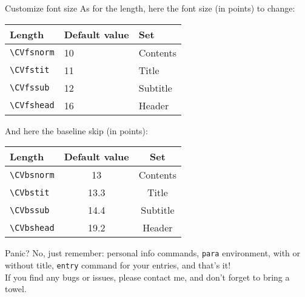 \documentclass[english]{michael-cv}
\begin{document}
\begin{para}{Customize font size}
As for the length, here the font size (in points) to change:\\[1ex]
\begin{tabular}{lll}
\toprule
Length			& Default value	& Set	\\
\midrule
\verb+\CVfsnorm+	& 10		& Contents	\\
\verb+\CVfstit+		& 11		& Title	\\
\verb+\CVfssub+		& 12		& Subtitle	\\
\verb+\CVfshead+	& 16		& Header	\\
\bottomrule
\end{tabular}

\vspace{1ex}
And here the baseline skip (in points):\\[1ex]
\begin{tabular}{lcc}
\toprule
Length		& Default value	& Set	\\
\midrule
\verb+\CVbsnorm+	& 13		& Contents	\\
\verb+\CVbstit+	& 13.3		& Title	\\
\verb+\CVbssub+	& 14.4		& Subtitle	\\
\verb+\CVbshead+	& 19.2		& Header	\\
\bottomrule
\end{tabular}
\end{para}

\begin{para}{Panic?}
No, just remember: personal info commands, \texttt{para} environment, with or without title, \texttt{entry} command for your entries, and that's it!\\
If you find any bugs or issues, please contact me, and don't forget to bring a towel.\\[2ex]
\end{para}
\end{document}
